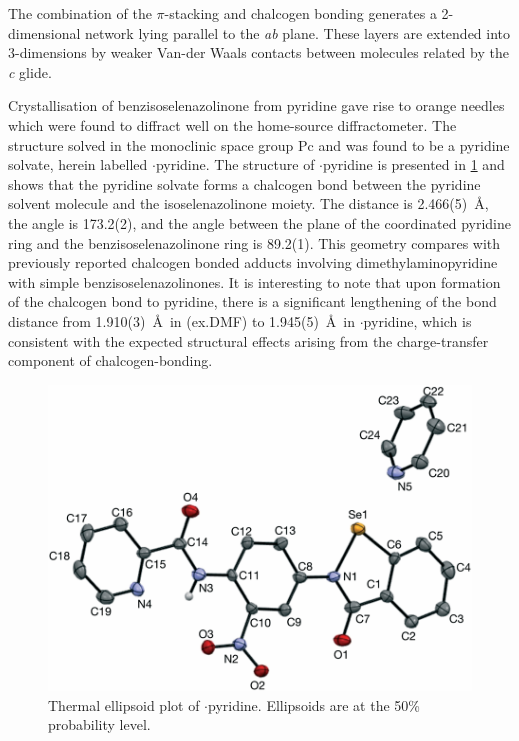 \begin{refsection}
    The combination of the $\pi$-stacking and chalcogen bonding generates a 2-dimension\-al network lying parallel to the \emph{ab} plane.
    These layers are extended into 3-dimensions by weaker Van-der Waals contacts between molecules related by the \emph{c} glide.
    
    Crystallisation of benzisoselenazolinone  from pyridine gave rise to orange needles which were found to diffract well on the home-source diffractometer.
    The structure solved in the monoclinic space group Pc and was found to be a pyridine solvate, herein labelled $\cdot$pyridine.
    The structure of $\cdot$pyridine is presented in \cref{fig:ebs-nitroamide-2py-py-xtal} and shows that the pyridine solvate forms a  chalcogen bond between the pyridine solvent molecule and the isoselenazolinone moiety.
    The  distance is 2.466(5)~\AA, the  angle is 173.2(2)\degree, and the angle between the plane of the coordinated pyridine ring and the benzisoselenazolinone ring is 89.2(1)\degree.
    This geometry compares with previously reported chalcogen bonded adducts involving dimethylaminopyridine with simple benzisoselenazolinones.\autocite{Fellowes2019}
    It is interesting to note that upon formation of the chalcogen bond to pyridine, there is a significant lengthening of the  bond distance from 1.910(3)~\AA~in (ex.DMF) to 1.945(5)~\AA~in $\cdot$pyridine, which is consistent with the expected structural effects arising from the charge-transfer component of chalcogen-bonding.\autocite{Fellowes2019,Pascoe2017}
    
    \begin{figure}
        \centering
        \includegraphics[width=0.8\linewidth]{Figures/ebs-nitroamide-2py-py-xtal.pdf}
        \caption[Thermal ellipsoid plot of $\cdot$pyridine.]{Thermal ellipsoid plot of $\cdot$pyridine. Ellipsoids are at the 50\% probability level.}\label{fig:ebs-nitroamide-2py-py-xtal}
    \end{figure}
    

\end{refsection}
